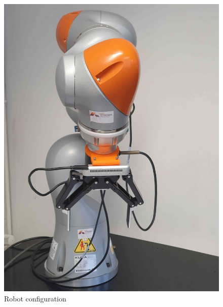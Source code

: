 \documentclass[11pt]{article}
\begin{document}
\begin{itemize}
\begin{figure}[htbp]
\centering
\includegraphics[width=.9\linewidth]{./iiwa_intel.jpg}
\caption{\label{fig:iiwa}
Robot configuration}
\end{figure}


\end{itemize}
\end{document}
